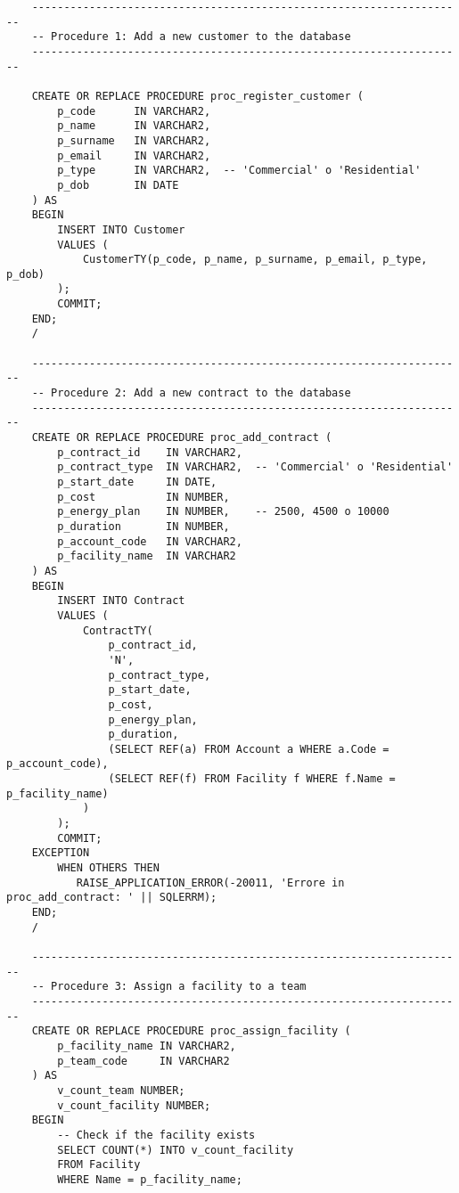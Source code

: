 \begin{lstlisting}
    --------------------------------------------------------------------
    -- Procedure 1: Add a new customer to the database
    --------------------------------------------------------------------
    
    CREATE OR REPLACE PROCEDURE proc_register_customer (
        p_code      IN VARCHAR2,
        p_name      IN VARCHAR2,
        p_surname   IN VARCHAR2,
        p_email     IN VARCHAR2,
        p_type      IN VARCHAR2,  -- 'Commercial' o 'Residential'
        p_dob       IN DATE
    ) AS
    BEGIN
        INSERT INTO Customer
        VALUES (
            CustomerTY(p_code, p_name, p_surname, p_email, p_type, p_dob)
        );
        COMMIT;
    END;
    /
    
    --------------------------------------------------------------------
    -- Procedure 2: Add a new contract to the database
    --------------------------------------------------------------------
    CREATE OR REPLACE PROCEDURE proc_add_contract (
        p_contract_id    IN VARCHAR2,
        p_contract_type  IN VARCHAR2,  -- 'Commercial' o 'Residential'
        p_start_date     IN DATE,
        p_cost           IN NUMBER,
        p_energy_plan    IN NUMBER,    -- 2500, 4500 o 10000
        p_duration       IN NUMBER,    
        p_account_code   IN VARCHAR2,
        p_facility_name  IN VARCHAR2
    ) AS
    BEGIN
        INSERT INTO Contract
        VALUES (
            ContractTY(
                p_contract_id,
                'N',
                p_contract_type,
                p_start_date,
                p_cost,
                p_energy_plan,
                p_duration,
                (SELECT REF(a) FROM Account a WHERE a.Code = p_account_code),
                (SELECT REF(f) FROM Facility f WHERE f.Name = p_facility_name)
            )
        );
        COMMIT;
    EXCEPTION
        WHEN OTHERS THEN
           RAISE_APPLICATION_ERROR(-20011, 'Errore in proc_add_contract: ' || SQLERRM);
    END;
    /
    
    --------------------------------------------------------------------
    -- Procedure 3: Assign a facility to a team
    --------------------------------------------------------------------
    CREATE OR REPLACE PROCEDURE proc_assign_facility (
        p_facility_name IN VARCHAR2,
        p_team_code     IN VARCHAR2
    ) AS
        v_count_team NUMBER;
        v_count_facility NUMBER;
    BEGIN
        -- Check if the facility exists
        SELECT COUNT(*) INTO v_count_facility
        FROM Facility
        WHERE Name = p_facility_name;
    

\end{lstlisting}
